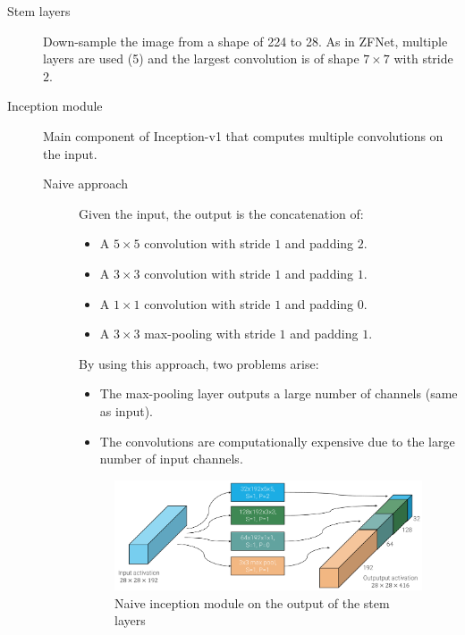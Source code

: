 \begin{description}
    \item[Stem layers]
        Down-sample the image from a shape of 224 to 28.
        As in ZFNet, multiple layers are used (5) and the largest convolution is of shape $7 \times 7$ with stride $2$.

    \item[Inception module] 
        Main component of Inception-v1 that computes multiple convolutions on the input.

        \begin{description}
            \item[Naive approach] 
                Given the input, the output is the concatenation of:
                \begin{itemize}
                    \item A $5 \times 5$ convolution with stride $1$ and padding $2$.
                    \item A $3 \times 3$ convolution with stride $1$ and padding $1$.
                    \item A $1 \times 1$ convolution with stride $1$ and padding $0$.
                    \item A $3 \times 3$ max-pooling with stride $1$ and padding $1$.
                \end{itemize} 

                By using this approach, two problems arise:
                \begin{itemize}
                    \item The max-pooling layer outputs a large number of channels (same as input).
                    \item The convolutions are computationally expensive due to the large number of input channels.
                \end{itemize}

                \begin{figure}[H]
                    \centering
                    \includegraphics[width=0.65\linewidth]{./img/_naive_inception.pdf}
                    \caption{Naive inception module on the output of the stem layers}
                \end{figure}
                

\end{description}
\end{description}
